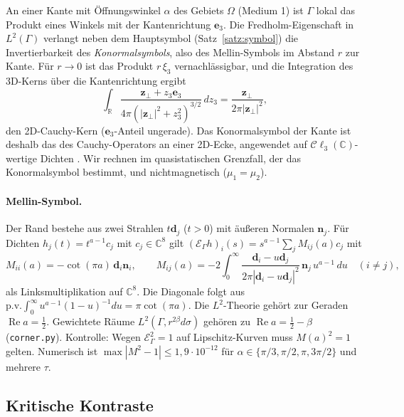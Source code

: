 \documentclass[11pt, a4paper]{article}
\newcommand{\mvec}[1]{\boldsymbol{#1}}
\newcommand{\clc}{\mathcal{C}\ell_{3}(\mathbb{C})}
\newcommand{\n}{\mvec{n}}
\newcommand{\EG}{\mathcal{E}_\Gamma}
\theoremstyle{plain}
\theoremstyle{definition}
\begin{document}
An einer Kante mit Öffnungswinkel $\alpha$ des Gebiets $\Omega$ (Medium 1) ist
$\Gamma$ lokal das Produkt eines Winkels mit der Kantenrichtung $\mvec{e}_3$. Die
Fredholm-Eigenschaft in $L^2(\Gamma)$ verlangt neben dem Hauptsymbol
(Satz~\ref{satz:symbol}) die Invertierbarkeit des \emph{Konormalsymbols}, also des
Mellin-Symbols im Abstand $r$ zur Kante. Für $r\to0$ ist das Produkt
$r\,\xi_3$ vernachlässigbar, und die Integration des 3D-Kerns über die
Kantenrichtung ergibt
\[
  \int_{\mathbb{R}}\frac{\mvec{z}_\perp + z_3\mvec{e}_3}{4\pi(|\mvec{z}_\perp|^2+z_3^2)^{3/2}}\,dz_3
  = \frac{\mvec{z}_\perp}{2\pi|\mvec{z}_\perp|^2},
\]
den 2D-Cauchy-Kern ($\mvec{e}_3$-Anteil ungerade). Das Konormalsymbol der Kante
ist deshalb das des Cauchy-Operators an einer 2D-Ecke, angewendet auf
$\clc$-wertige Dichten {\small{}}. Wir rechnen im
quasistatischen Grenzfall, der das Konormalsymbol bestimmt, und nichtmagnetisch
($\mu_1=\mu_2$).

\paragraph{Mellin-Symbol.} Der Rand bestehe aus zwei Strahlen $t\mvec{d}_j$
($t>0$) mit äußeren Normalen $\n_j$. Für Dichten $h_j(t) = t^{a-1}c_j$ mit
$c_j\in\mathbb{C}^8$ gilt $(\EG h)_i(s) = s^{a-1}\sum_j M_{ij}(a)c_j$ mit
\[
  M_{ii}(a) = -\cot(\pi a)\,\mvec{d}_i\n_i,\qquad
  M_{ij}(a) = -2\int_0^\infty\frac{\mvec{d}_i - u\mvec{d}_j}{2\pi|\mvec{d}_i-u\mvec{d}_j|^2}\,
  \n_j\,u^{a-1}\,du\quad(i\neq j),
\]
als Linksmultiplikation auf $\mathbb{C}^8$. Die Diagonale folgt aus
$\mathrm{p.v.}\int_0^\infty u^{a-1}(1-u)^{-1}du = \pi\cot(\pi a)$. Die $L^2$-Theorie
gehört zur Geraden $\operatorname{Re}a = \tfrac12$. Gewichtete Räume
$L^2(\Gamma, r^{2\beta}d\sigma)$ gehören zu $\operatorname{Re}a = \tfrac12-\beta$
(\texttt{corner.py}). Kontrolle: Wegen $\EG^2=1$ auf Lipschitz-Kurven muss
$M(a)^2 = 1$ gelten. Numerisch ist $\max|M^2-1|\le1{,}9\cdot10^{-12}$ für
$\alpha\in\{\pi/3,\pi/2,\pi,3\pi/2\}$ und mehrere $\tau$.

\subsection{Kritische Kontraste}
\end{document}
